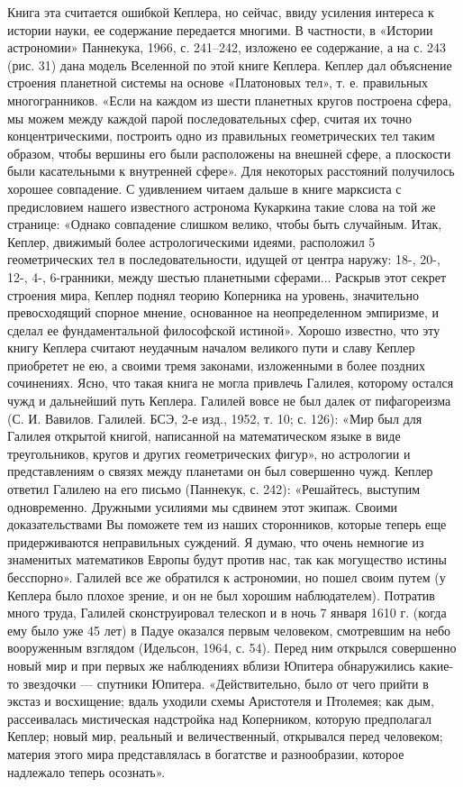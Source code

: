 Книга  эта  считается  ошибкой  Кеплера,  но  сейчас,  ввиду  усиления
интереса  к  истории  науки,   ее  содержание  передается  многими.  В
частности,  в  «Истории  астрономии»  Паннекука,  1966,  с.  241--242,
изложено ее содержание, а на с. 243 (рис. 31) дана модель Вселенной по
этой книге  Кеплера. Кеплер дал объяснение  строения планетной системы
на основе «Платоновых тел», т.  е. правильных многогранников. «Если на
каждом  из шести  планетных  кругов построена  сфера,  мы можем  между
каждой парой последовательных сфер,  считая их точно концентрическими,
построить одно  из правильных геометрических тел  таким образом, чтобы
вершины  его  были расположены  на  внешней  сфере, а  плоскости  были
касательными к внутренней сфере».  Для некоторых расстояний получилось
хорошее совпадение.  С удивлением  читаем дальше  в книге  марксиста с
предисловием нашего известного астронома  Кукаркина такие слова на той
же странице: «Однако совпадение  слишком велико, чтобы быть случайным.
Итак,  Кеплер, движимый  более астрологическими  идеями, расположил  5
геометрических  тел в  последовательности,  идущей  от центра  наружу:
18-,  20-, 12-,  4-,  6-гранники, между  шестью планетными  сферами...
Раскрыв этот секрет  строения мира, Кеплер поднял  теорию Коперника на
уровень,  значительно  превосходящий  спорное  мнение,  основанное  на
неопределенном  эмпиризме,  и  сделал ее  фундаментальной  философской
истиной».  Хорошо известно,  что эту  книгу Кеплера  считают неудачным
началом великого пути и славу Кеплер  приобретет не ею, а своими тремя
законами,  изложенными в  более  поздних сочинениях.  Ясно, что  такая
книга не  могла привлечь Галилея,  которому остался чужд  и дальнейший
путь  Кеплера. Галилей  вовсе  не  был далек  от  пифагореизма (С.  И.
Вавилов. Галилей.  БСЭ, 2-е изд., 1952,  т. 10; с. 126):  «Мир был для
Галилея  открытой книгой,  написанной на  математическом языке  в виде
треугольников, кругов и других  геометрических фигур», но астрологии и
представлениям  о  связях  между  планетами он  был  совершенно  чужд.
Кеплер ответил Галилею  на его письмо (Паннекук,  с. 242): «Решайтесь,
выступим  одновременно.  Дружными  усилиями мы  сдвинем  этот  экипаж.
Своими доказательствами Вы поможете  тем из наших сторонников, которые
теперь еще  придерживаются неправильных  суждений. Я думаю,  что очень
немногие из  знаменитых математиков Европы  будут против нас,  так как
могущество истины  бесспорно». Галилей все же  обратился к астрономии,
но  пошел своим  путем (у  Кеплера  было плохое  зрение, и  он не  был
хорошим  наблюдателем). Потратив  много труда,  Галилей сконструировал
телескоп и в ночь 7 января 1610 г. (когда ему было уже 45 лет) в Падуе
оказался  первым человеком,  смотревшим на  небо вооруженным  взглядом
(Идельсон,  1964, с.  54).  Перед ним  открылся  совершенно новый  мир
и  при  первых же  наблюдениях  вблизи  Юпитера обнаружились  какие-то
звездочки --- спутники Юпитера. «Действительно,  было от чего прийти в
экстаз и  восхищение; вдаль уходили  схемы Аристотеля и  Птолемея; как
дым,  рассеивалась  мистическая  надстройка  над  Коперником,  которую
предполагал Кеплер;  новый мир, реальный и  величественный, открывался
перед  человеком;  материя этого  мира  представлялась  в богатстве  и
разнообразии, которое надлежало теперь осознать».

